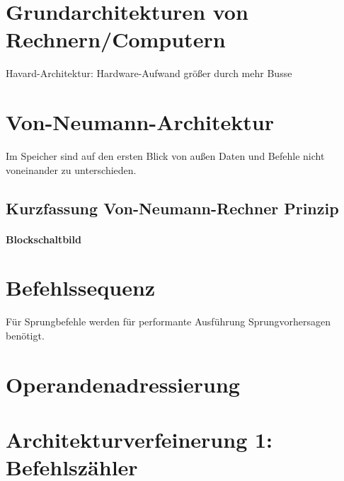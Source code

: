 
\section{Grundarchitekturen von Rechnern/Computern}
Havard-Architektur: Hardware-Aufwand größer durch mehr Busse

\section{Von-Neumann-Architektur}
Im Speicher sind auf den ersten Blick von außen Daten und Befehle nicht voneinander zu unterschieden.

\subsection{Kurzfassung Von-Neumann-Rechner Prinzip}
\paragraph{Blockschaltbild}

\section{Befehlssequenz}
Für Sprungbefehle werden für performante Ausführung Sprungvorhersagen benötigt.

\section{Operandenadressierung}

\section{Architekturverfeinerung 1: Befehlszähler}

